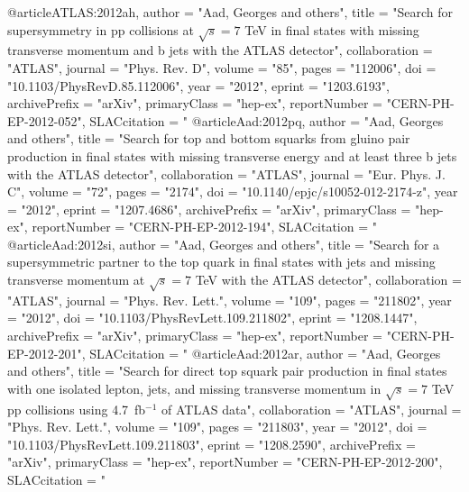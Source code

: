 @article{ATLAS:2012ah,
      author         = "Aad, Georges and others",
      title          = "{Search for supersymmetry in pp collisions at
                        $\sqrt{s}=7$ TeV in final states with missing transverse
                        momentum and b jets with the ATLAS detector}",
      collaboration  = "ATLAS",
      journal        = "Phys. Rev. D",
      volume         = "85",
      pages          = "112006",
      doi            = "10.1103/PhysRevD.85.112006",
      year           = "2012",
      eprint         = "1203.6193",
      archivePrefix  = "arXiv",
      primaryClass   = "hep-ex",
      reportNumber   = "CERN-PH-EP-2012-052",
      SLACcitation   = "%
}
@article{Aad:2012pq,
      author         = "Aad, Georges and others",
      title          = "{Search for top and bottom squarks from gluino pair
                        production in final states with missing transverse energy
                        and at least three b jets with the {ATLAS} detector}",
      collaboration  = "ATLAS",
      journal        = "Eur. Phys. J. C",
      volume         = "72",
      pages          = "2174",
      doi            = "10.1140/epjc/s10052-012-2174-z",
      year           = "2012",
      eprint         = "1207.4686",
      archivePrefix  = "arXiv",
      primaryClass   = "hep-ex",
      reportNumber   = "CERN-PH-EP-2012-194",
      SLACcitation   = "%
}
@article{Aad:2012si,
      author         = "Aad, Georges and others",
      title          = "{Search for a supersymmetric partner to the top quark in
                        final states with jets and missing transverse momentum at
                        $\sqrt{s}=7$ {TeV} with the {ATLAS} detector}",
      collaboration  = "ATLAS",
      journal        = "Phys. Rev. Lett.",
      volume         = "109",
      pages          = "211802",
      year           = "2012",
      doi            = "10.1103/PhysRevLett.109.211802",
      eprint         = "1208.1447",
      archivePrefix  = "arXiv",
      primaryClass   = "hep-ex",
      reportNumber   = "CERN-PH-EP-2012-201",
      SLACcitation   = "%
}
@article{Aad:2012ar,
      author         = "Aad, Georges and others",
      title          = "{Search for direct top squark pair production in final
                        states with one isolated lepton, jets, and missing
                        transverse momentum in $\sqrt{s}=7$ {TeV} pp collisions
                        using 4.7~fb$^{-1}$ of {ATLAS} data}",
      collaboration  = "ATLAS",
      journal        = "Phys. Rev. Lett.",
      volume         = "109",
      pages          = "211803",
      year           = "2012",
      doi            = "10.1103/PhysRevLett.109.211803",
      eprint         = "1208.2590",
      archivePrefix  = "arXiv",
      primaryClass   = "hep-ex",
      reportNumber   = "CERN-PH-EP-2012-200",
      SLACcitation   = "%
}

